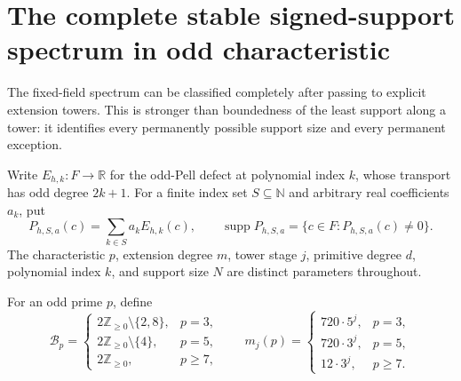 \documentclass[11pt]{article}
\begin{document}
\section{The complete stable signed-support spectrum in odd characteristic}
\label{sec:odd-pell-stable-spectrum}

The fixed-field spectrum can be classified completely after passing to
explicit extension towers. This is stronger than boundedness of the least
support along a tower: it identifies every permanently possible support
size and every permanent exception.

Write \(E_{h,k}:F\to\mathbb R\) for the odd-Pell defect at polynomial
index \(k\), whose transport has odd degree \(2k+1\). For a finite index
set \(S\subseteq\mathbb N\) and arbitrary real coefficients \(a_k\), put
\[
 P_{h,S,a}(c)=\sum_{k\in S}a_k E_{h,k}(c),
 \qquad
 \operatorname{supp}P_{h,S,a}=\{c\in F:P_{h,S,a}(c)\ne0\}.
\]
The characteristic \(p\), extension degree \(m\), tower stage \(j\),
primitive degree \(d\), polynomial index \(k\), and support size \(N\)
are distinct parameters throughout.

For an odd prime \(p\), define
\[
 \mathcal B_p=
 \begin{cases}
  2\mathbb Z_{\ge0}\setminus\{2,8\},&p=3,\\
  2\mathbb Z_{\ge0}\setminus\{4\},&p=5,\\
  2\mathbb Z_{\ge0},&p\ge7,
 \end{cases}
 \qquad
 m_j(p)=
 \begin{cases}
  720\cdot5^j,&p=3,\\
  720\cdot3^j,&p=5,\\
  12\cdot3^j,&p\ge7.
 \end{cases}
\]
\end{document}
